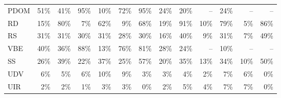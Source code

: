 \begin{figure*}[t]
{\begin{tabular}{lrrrrrr|rrrrrr}
\multicolumn{1}{l}{PDOM} & \cellcolor{lightblack}51\%  & \cellcolor{lightblack}41\%  & \cellcolor{lightgreen}95\%  &  \cellcolor{lightblue}10\%   & \cellcolor{lightgreen}72\%  & \cellcolor{lightgreen}95\%  & \cellcolor{lightblack}24\%  & \cellcolor{lightblack}20\%  & --  &  \cellcolor{lightblack}24\%   & --  & -- \\
\multicolumn{1}{l}{RD} & \cellcolor{lightblack}15\%  & \cellcolor{lightgreen}80\%  &  \cellcolor{lightblue}7\%   & \cellcolor{lightgreen}62\%  &  \cellcolor{lightblue}9\%   & \cellcolor{lightgreen}68\%  & \cellcolor{lightblack}19\%  & \cellcolor{lightgreen}91\%  &  \cellcolor{lightblue}10\%   & \cellcolor{lightgreen}79\%  &  \cellcolor{lightblue}5\%   & \cellcolor{lightgreen}86\% \\
\multicolumn{1}{l}{RS} & \cellcolor{lightblack}31\%  & \cellcolor{lightblack}31\%  & \cellcolor{lightblack}30\%  & \cellcolor{lightblack}31\%  & \cellcolor{lightblack}28\%  & \cellcolor{lightblack}30\%  & \cellcolor{lightblack}16\%  & \cellcolor{lightblack}40\%  & \cellcolor{lightblue}9\%  & \cellcolor{lightblack}31\%  & \cellcolor{lightblue}7\%  & \cellcolor{lightblack}49\% \\
\multicolumn{1}{l}{VBE} & \cellcolor{lightblack}40\%  & \cellcolor{lightblack}36\%  & \cellcolor{lightgreen}88\%  &  \cellcolor{lightblack}13\%   & \cellcolor{lightgreen}76\%  & \cellcolor{lightgreen}81\%  & \cellcolor{lightblack}28\%  & \cellcolor{lightblack}24\%  & --  &  \cellcolor{lightblue}10\%   & --  & -- \\
\multicolumn{1}{l}{SS} & \cellcolor{lightblack}26\%  & \cellcolor{lightblack}39\%  & \cellcolor{lightblack}22\%  & \cellcolor{lightblack}37\%  & \cellcolor{lightblack}25\%  & \cellcolor{lightgreen}57\%  & \cellcolor{lightblack}20\%  & \cellcolor{lightblack}35\%  & \cellcolor{lightblack}13\%  & \cellcolor{lightblack}34\%  & \cellcolor{lightblue}10\%  & \cellcolor{lightgreen}50\% \\
\multicolumn{1}{l}{UDV} &  \cellcolor{lightblue}6\%   &  \cellcolor{lightblue}5\%   &  \cellcolor{lightblue}6\%   &  \cellcolor{lightblue}10\%   &  \cellcolor{lightblue}9\%   &  \cellcolor{lightblue}3\%   &  \cellcolor{lightblue}3\%   &  \cellcolor{lightblue}4\%   &  \cellcolor{lightblue}2\%   &  \cellcolor{lightblue}7\%   &  \cellcolor{lightblue}6\%   &  \cellcolor{lightblue}0\% \\
\multicolumn{1}{l}{UIR} &  \cellcolor{lightblue}2\%   &  \cellcolor{lightblue}2\%   &  \cellcolor{lightblue}1\%   & \cellcolor{lightblue}3\%   & \cellcolor{lightblue}3\%   & \cellcolor{lightblue}0\%   &  \cellcolor{lightblue}2\%   &  \cellcolor{lightblue}5\%   &  \cellcolor{lightblue}4\%   & \cellcolor{lightblue}7\%   & \cellcolor{lightblue}7\%   & \cellcolor{lightblue}0\% \\

\end{tabular}}
\end{figure*}
